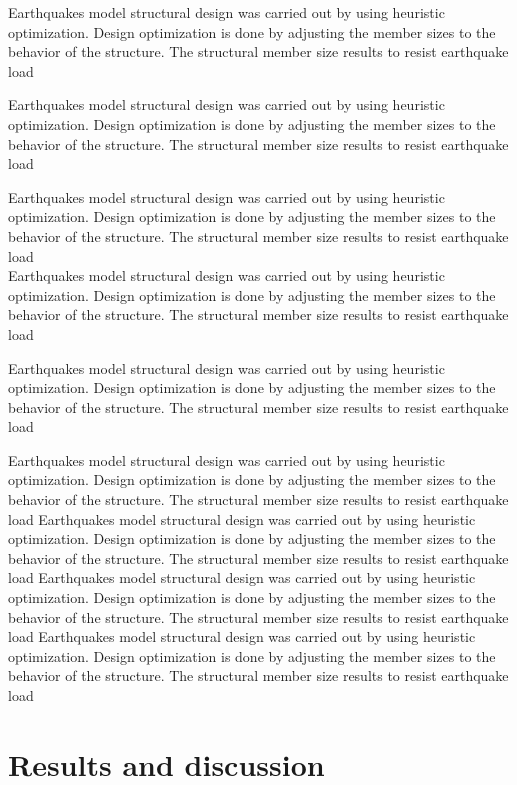 \documentclass{cup-pan}
\begin{document}
Earthquakes model structural design was carried out by using heuristic optimization. Design optimization is done by adjusting the member sizes to the behavior of the structure. The structural member size results to resist earthquake load

Earthquakes model structural design was carried out by using heuristic optimization. Design optimization is done by adjusting the member sizes to the behavior of the structure. The structural member size results to resist earthquake load

Earthquakes model structural design was carried out by using heuristic optimization. Design optimization is done by adjusting the member sizes to the behavior of the structure. The structural member size results to resist earthquake load\\

Earthquakes model structural design was carried out by using heuristic optimization. Design optimization is done by adjusting the member sizes to the behavior of the structure. The structural member size results to resist earthquake load

Earthquakes model structural design was carried out by using heuristic optimization. Design optimization is done by adjusting the member sizes to the behavior of the structure. The structural member size results to resist earthquake load


Earthquakes model structural design was carried out by using heuristic optimization. Design optimization is done by adjusting the member sizes to the behavior of the structure. The structural member size results to resist earthquake load
Earthquakes model structural design was carried out by using heuristic optimization. Design optimization is done by adjusting the member sizes to the behavior of the structure. The structural member size results to resist earthquake load
Earthquakes model structural design was carried out by using heuristic optimization. Design optimization is done by adjusting the member sizes to the behavior of the structure. The structural member size results to resist earthquake load
Earthquakes model structural design was carried out by using heuristic optimization. Design optimization is done by adjusting the member sizes to the behavior of the structure. The structural member size results to resist earthquake load

\section{Results and discussion}
\label{sec:results}
\end{document}
